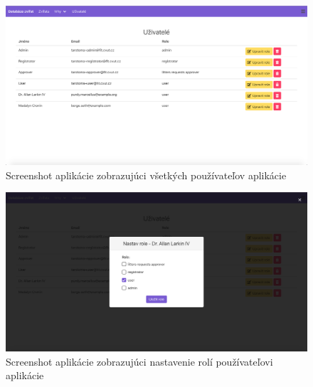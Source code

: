 \begin{figure}[H]
	\includegraphics[width=1.0\textwidth]{media/priloha/pouzivatelia/1.png}
	\caption{Screenshot aplikácie zobrazujúci všetkých používateľov aplikácie}
\end{figure}

\vspace*{\fill}

\begin{figure}[H]
	\includegraphics[width=1.0\textwidth]{media/priloha/pouzivatelia/2.png}
	\caption{Screenshot aplikácie zobrazujúci nastavenie rolí používateľovi aplikácie}
\end{figure}




